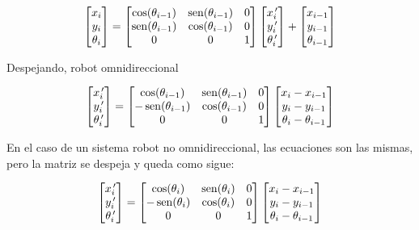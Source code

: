$$
\begin{bmatrix}
x_{i} \\
y_{i} \\
\theta_{i}
\end{bmatrix} = \begin{bmatrix}
\cos (\theta_{i - 1}) & \mathop{\rm sen}\nolimits (\theta_{i - 1}) & 0 \\
\mathop{\rm sen}\nolimits (\theta_{i - 1}) & \cos (\theta_{i - 1}) & 0 \\
0                     &                0      & 1
\end{bmatrix} \begin{bmatrix}
x_{i}^{\,\prime} \\
y_{i}^{\,\prime} \\
\theta_{i}^{\,\prime}
\end{bmatrix} + \begin{bmatrix}
x_{i - 1} \\
y_{i - 1} \\
\theta_{i - 1}
\end{bmatrix}
$$

Despejando, robot omnidireccional

$$
\begin{bmatrix}
x_{i}^{\,\prime} \\
y_{i}^{\, \prime} \\
\theta_{i}^{\, \prime}
\end{bmatrix} = \begin{bmatrix}
\cos (\theta_{i - 1}) & \mathop{\rm sen}\nolimits (\theta_{i - 1}) & 0 \\
- \mathop{\rm sen}\nolimits (\theta_{i - 1}) & \cos (\theta_{i - 1}) & 0 \\
0                     &                0      & 1
\end{bmatrix} \begin{bmatrix}
x_{i} - x_{i - 1} \\
y_{i} - y_{i - 1}\\
\theta_{i} - \theta_{i - 1}
\end{bmatrix} 
$$

En el caso de un sistema robot no omnidireccional, las ecuaciones son las mismas, pero la matriz se despeja y queda como sigue:

$$
\begin{bmatrix}
x_{i}^{\,\prime} \\
y_{i}^{\, \prime} \\
\theta_{i}^{\, \prime}
\end{bmatrix} = \begin{bmatrix}
\cos (\theta_{i}) & \mathop{\rm sen}\nolimits (\theta_{i}) & 0 \\
- \mathop{\rm sen}\nolimits (\theta_{i}) & \cos (\theta_{i}) & 0 \\
0                     &                0      & 1
\end{bmatrix} \begin{bmatrix}
x_{i} - x_{i - 1} \\
y_{i} - y_{i - 1}\\
\theta_{i} - \theta_{i - 1}
\end{bmatrix} 
$$ 

